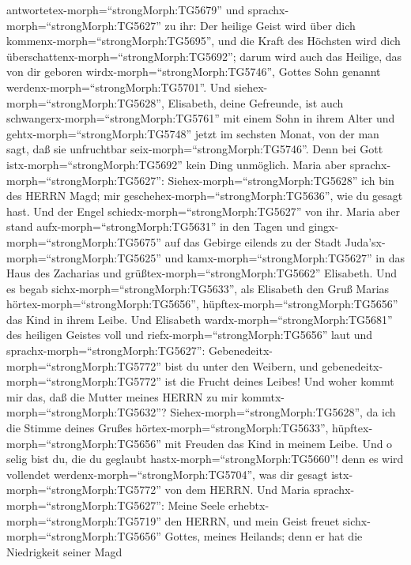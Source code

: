 antwortetex-morph=``strongMorph:TG5679'' und
sprachx-morph=``strongMorph:TG5627'' zu ihr: Der heilige Geist wird über
dich kommenx-morph=``strongMorph:TG5695'', und die Kraft des Höchsten
wird dich überschattenx-morph=``strongMorph:TG5692''; darum wird auch
das Heilige, das von dir geboren wirdx-morph=``strongMorph:TG5746'',
Gottes Sohn genannt werdenx-morph=``strongMorph:TG5701''. 
Und siehex-morph=``strongMorph:TG5628'', Elisabeth, deine Gefreunde, ist
auch schwangerx-morph=``strongMorph:TG5761'' mit einem Sohn in ihrem
Alter und gehtx-morph=``strongMorph:TG5748'' jetzt im sechsten Monat,
von der man sagt, daß sie unfruchtbar seix-morph=``strongMorph:TG5746''.
 Denn bei Gott istx-morph=``strongMorph:TG5692'' kein Ding
unmöglich.  Maria aber
sprachx-morph=``strongMorph:TG5627'':
Siehex-morph=``strongMorph:TG5628'' ich bin des HERRN Magd; mir
geschehex-morph=``strongMorph:TG5636'', wie du gesagt hast. Und der
Engel schiedx-morph=``strongMorph:TG5627'' von ihr.  Maria
aber stand aufx-morph=``strongMorph:TG5631'' in den Tagen und
gingx-morph=``strongMorph:TG5675'' auf das Gebirge eilends zu der Stadt
Juda'sx-morph=``strongMorph:TG5625''  und
kamx-morph=``strongMorph:TG5627'' in das Haus des Zacharias und
grüßtex-morph=``strongMorph:TG5662'' Elisabeth.  Und es
begab sichx-morph=``strongMorph:TG5633'', als Elisabeth den Gruß Marias
hörtex-morph=``strongMorph:TG5656'',
hüpftex-morph=``strongMorph:TG5656'' das Kind in ihrem Leibe. Und
Elisabeth wardx-morph=``strongMorph:TG5681'' des heiligen Geistes voll
 und riefx-morph=``strongMorph:TG5656'' laut und
sprachx-morph=``strongMorph:TG5627'':
Gebenedeitx-morph=``strongMorph:TG5772'' bist du unter den Weibern, und
gebenedeitx-morph=``strongMorph:TG5772'' ist die Frucht deines Leibes!
 Und woher kommt mir das, daß die Mutter meines HERRN zu
mir kommtx-morph=``strongMorph:TG5632''? 
Siehex-morph=``strongMorph:TG5628'', da ich die Stimme deines Grußes
hörtex-morph=``strongMorph:TG5633'',
hüpftex-morph=``strongMorph:TG5656'' mit Freuden das Kind in meinem
Leibe.  Und o selig bist du, die du geglaubt
hastx-morph=``strongMorph:TG5660''! denn es wird vollendet
werdenx-morph=``strongMorph:TG5704'', was dir gesagt
istx-morph=``strongMorph:TG5772'' von dem HERRN.  Und Maria
sprachx-morph=``strongMorph:TG5627'': Meine Seele
erhebtx-morph=``strongMorph:TG5719'' den HERRN,  und mein
Geist freuet sichx-morph=``strongMorph:TG5656'' Gottes, meines Heilands;
 denn er hat die Niedrigkeit seiner Magd
